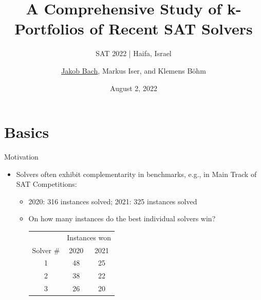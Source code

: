 \documentclass[en]{sdqbeamer}
\title[A Comprehensive Study of k-Portfolios of Recent SAT Solvers]{A Comprehensive Study of k-Portfolios of Recent SAT Solvers} %
\subtitle{SAT 2022 | Haifa, Israel}
\author[\underline{Jakob Bach}, Markus Iser, and Klemens Böhm]{\underline{Jakob Bach}, Markus Iser, and Klemens Böhm} %
\date[2022-08-02]{August 2, 2022} %
\begin{document}
\KITtitleframe

\section{Basics}

\begin{frame}[t]{Motivation}
	\begin{itemize}
		\pause
		\item Solvers often exhibit complementarity in benchmarks, e.g., in Main Track of SAT Competitions:
		\begin{itemize}
			\item 2020: 316 instances solved; 2021: 325 instances solved
			\pause
			\item On how many instances do the best individual solvers win? \\
			\vspace{\baselineskip}
			\begin{tabular}{ccc}
				\toprule
				& \multicolumn{2}{c}{Instances won} \\
				\cmidrule{2-3}
				Solver \# & 2020 & 2021 \\
				\midrule
				1 & 48 & 25 \\
				2 & 38 & 22 \\
				3 & 26 & 20 \\
				\bottomrule
			\end{tabular}

\end{itemize}
\end{itemize}
\end{frame}
\end{document}

